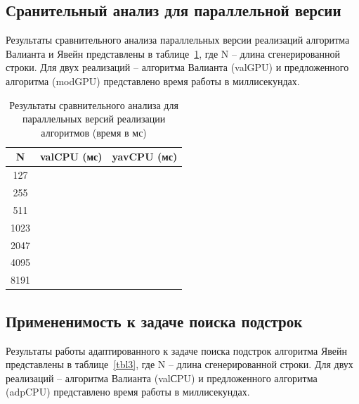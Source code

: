 \documentclass[14pt]{matmex-diploma-custom}
\begin{document}
\subsection{Сранительный анализ для параллельной версии}

Результаты сравнительного анализа параллельных версии реализаций алгоритма Валианта и Явейн представлены в таблице~\ref{tbl2}, где N – длина сгенерированной строки. Для двух реализаций – алгоритма Валианта (valGPU) и предложенного алгоритма (modGPU) представлено время работы в миллисекундах.

\begin{table}[h]
\centering
\caption{Результаты сравнительного анализа для параллельных версий реализации алгоритмов (время в мс)}
\label{tbl2}

    \begin{center}
        \begin{tabular}{ |c|c|c| } 
        \hline
        N & valCPU (мс) &  yavCPU (мс)\\
        \hline
        \hline
         127 &  &  \\ 
         255 &  &  \\ 
         511 &  &  \\ 
         1023 &  &  \\
         2047 &  &  \\
         4095 &  &  \\
         8191 &  &  \\
         \hline
        \end{tabular}
    \end{center}

\end{table}

\subsection{Примененимость к задаче поиска подстрок}

Результаты работы адаптированного к задаче поиска подстрок алгоритма Явейн представлены в таблице~\ref{tbl3}, где N – длина сгенерированной строки. Для двух реализаций – алгоритма Валианта (valСPU) и предложенного алгоритма (adpCPU) представлено время работы в миллисекундах.
\end{document}
